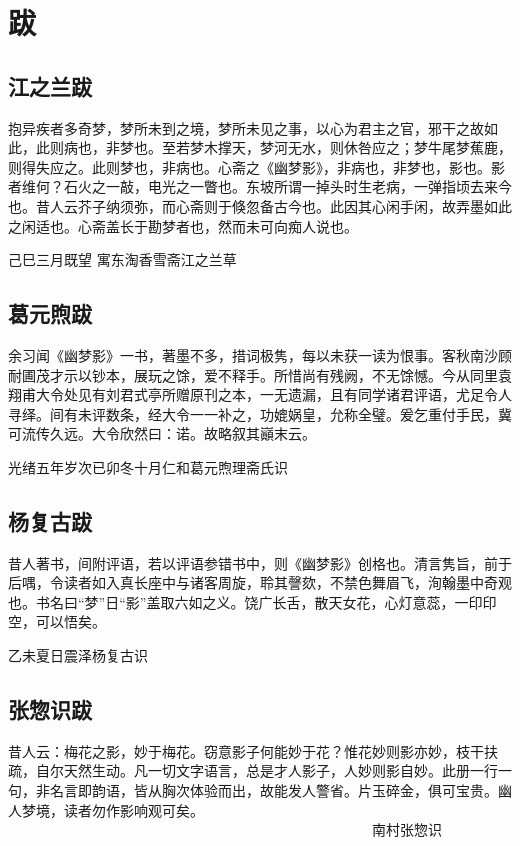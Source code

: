 \chapter*{跋}

\section{江之兰跋}
抱异疾者多奇梦，梦所未到之境，梦所未见之事，以心为君主之官，邪干之故如此，此则病也，非梦也。至若梦木撑天，梦河无水，则休咎应之；梦牛尾梦蕉鹿，则得失应之。此则梦也，非病也。心斋之《幽梦影》，非病也，非梦也，影也。影者维何？石火之一敲，电光之一瞥也。东坡所谓一掉头时生老病，一弹指顷去来今也。昔人云芥子纳须弥，而心斋则于倏忽备古今也。此因其心闲手闲，故弄墨如此之闲适也。心斋盖长于勘梦者也，然而未可向痴人说也。



己巳三月既望 寓东淘香雪斋江之兰草


\section{葛元煦跋}
余习闻《幽梦影》一书，著墨不多，措词极隽，每以未获一读为恨事。客秋南沙顾耐圃茂才示以钞本，展玩之馀，爱不释手。所惜尚有残阙，不无馀憾。今从同里袁翔甫大令处见有刘君式亭所赠原刊之本，一无遗漏，且有同学诸君评语，尤足令人寻绎。间有未评数条，经大令一一补之，功媲娲皇，允称全璧。爰乞重付手民，冀可流传久远。大令欣然曰：诺。故略叙其巓末云。



光绪五年岁次已卯冬十月仁和葛元煦理斋氏识


\section{杨复古跋}
昔人著书，间附评语，若以评语参错书中，则《幽梦影》创格也。清言隽旨，前于后喁，令读者如入真长座中与诸客周旋，聆其謦欬，不禁色舞眉飞，洵翰墨中奇观也。书名曰“梦”日“影”盖取六如之义。饶广长舌，散天女花，心灯意蕊，一印印空，可以悟矣。



乙未夏日震泽杨复古识


\section{张惣识跋}
昔人云：梅花之影，妙于梅花。窃意影子何能妙于花？惟花妙则影亦妙，枝干扶疏，自尔天然生动。凡一切文字语言，总是才人影子，人妙则影自妙。此册一行一句，非名言即韵语，皆从胸次体验而出，故能发人警省。片玉碎金，俱可宝贵。幽人梦境，读者勿作影响观可矣。 　　　　　　　　　　　　　　　　　　　　　　　　　　南村张惣识
